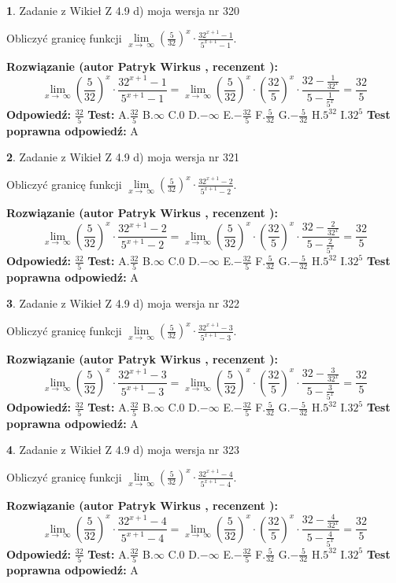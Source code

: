 \documentclass[12pt, a4paper]{article}
\theoremstyle{definition} %
\newtheorem{zad}{}
\newcommand{\zadStart}[1]{\begin{zad}#1\newline}
\newcommand{\zadStop}{\end{zad}}
\newcommand{\rozwStart}[2]{\noindent \textbf{Rozwiązanie (autor #1 , recenzent #2): }\newline}
\newcommand{\rozwStop}{\newline}
\newcommand{\odpStart}{\noindent \textbf{Odpowiedź:}\newline}
\newcommand{\odpStop}{\newline}
\newcommand{\testStart}{\noindent \textbf{Test:}\newline}
\newcommand{\testStop}{\newline}
\newcommand{\kluczStart}{\noindent \textbf{Test poprawna odpowiedź:}\newline}
\newcommand{\kluczStop}{\newline}
\begin{document}
\zadStart{Zadanie z Wikieł Z 4.9 d) moja wersja nr 320}


Obliczyć granicę funkcji  $\lim\limits_{x\to\ \infty}(\frac{5}{32})^{x}\cdot\frac{32^{x+1}-1}{5^{x+1}-1}$.
\zadStop
\rozwStart{Patryk Wirkus}{}
$$\lim\limits_{x\to\ \infty}(\frac{5}{32})^{x}\cdot\frac{32^{x+1}-1}{5^{x+1}-1}=\lim\limits_{x\to\ \infty}(\frac{5}{32})^{x}\cdot(\frac{32}{5})^{x} \cdot \frac{32-\frac{1}{32^{x}}}{5-\frac{1}{5^{x}}} = \frac{32}{5}$$
\rozwStop
\odpStart
$\frac{32}{5}$
\odpStop
\testStart
A.$\frac{32}{5}$ B.$\infty$ C.$0$ D.$-\infty$ E.$-\frac{32}{5}$
F.$\frac{5}{32}$ G.$-\frac{5}{32}$
H.$5^{32}$
I.$32^{5}$
\testStop
\kluczStart
A
\kluczStop



\zadStart{Zadanie z Wikieł Z 4.9 d) moja wersja nr 321}


Obliczyć granicę funkcji  $\lim\limits_{x\to\ \infty}(\frac{5}{32})^{x}\cdot\frac{32^{x+1}-2}{5^{x+1}-2}$.
\zadStop
\rozwStart{Patryk Wirkus}{}
$$\lim\limits_{x\to\ \infty}(\frac{5}{32})^{x}\cdot\frac{32^{x+1}-2}{5^{x+1}-2}=\lim\limits_{x\to\ \infty}(\frac{5}{32})^{x}\cdot(\frac{32}{5})^{x} \cdot \frac{32-\frac{2}{32^{x}}}{5-\frac{2}{5^{x}}} = \frac{32}{5}$$
\rozwStop
\odpStart
$\frac{32}{5}$
\odpStop
\testStart
A.$\frac{32}{5}$ B.$\infty$ C.$0$ D.$-\infty$ E.$-\frac{32}{5}$
F.$\frac{5}{32}$ G.$-\frac{5}{32}$
H.$5^{32}$
I.$32^{5}$
\testStop
\kluczStart
A
\kluczStop



\zadStart{Zadanie z Wikieł Z 4.9 d) moja wersja nr 322}


Obliczyć granicę funkcji  $\lim\limits_{x\to\ \infty}(\frac{5}{32})^{x}\cdot\frac{32^{x+1}-3}{5^{x+1}-3}$.
\zadStop
\rozwStart{Patryk Wirkus}{}
$$\lim\limits_{x\to\ \infty}(\frac{5}{32})^{x}\cdot\frac{32^{x+1}-3}{5^{x+1}-3}=\lim\limits_{x\to\ \infty}(\frac{5}{32})^{x}\cdot(\frac{32}{5})^{x} \cdot \frac{32-\frac{3}{32^{x}}}{5-\frac{3}{5^{x}}} = \frac{32}{5}$$
\rozwStop
\odpStart
$\frac{32}{5}$
\odpStop
\testStart
A.$\frac{32}{5}$ B.$\infty$ C.$0$ D.$-\infty$ E.$-\frac{32}{5}$
F.$\frac{5}{32}$ G.$-\frac{5}{32}$
H.$5^{32}$
I.$32^{5}$
\testStop
\kluczStart
A
\kluczStop



\zadStart{Zadanie z Wikieł Z 4.9 d) moja wersja nr 323}


Obliczyć granicę funkcji  $\lim\limits_{x\to\ \infty}(\frac{5}{32})^{x}\cdot\frac{32^{x+1}-4}{5^{x+1}-4}$.
\zadStop
\rozwStart{Patryk Wirkus}{}
$$\lim\limits_{x\to\ \infty}(\frac{5}{32})^{x}\cdot\frac{32^{x+1}-4}{5^{x+1}-4}=\lim\limits_{x\to\ \infty}(\frac{5}{32})^{x}\cdot(\frac{32}{5})^{x} \cdot \frac{32-\frac{4}{32^{x}}}{5-\frac{4}{5^{x}}} = \frac{32}{5}$$
\rozwStop
\odpStart
$\frac{32}{5}$
\odpStop
\testStart
A.$\frac{32}{5}$ B.$\infty$ C.$0$ D.$-\infty$ E.$-\frac{32}{5}$
F.$\frac{5}{32}$ G.$-\frac{5}{32}$
H.$5^{32}$
I.$32^{5}$
\testStop
\kluczStart
A
\kluczStop
\end{document}
